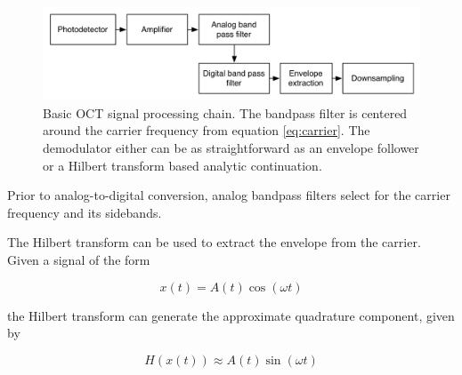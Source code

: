 
\begin{figure}[h!]
  \centering
  \includegraphics[width=1.0\textwidth]{Images/background/basic_dsp.png}
\caption[Basic OCT signal processing chain.]{Basic OCT signal processing chain. The bandpass filter is centered around the carrier frequency from equation \ref{eq:carrier}. The demodulator either can be as straightforward as an envelope follower or a Hilbert transform based analytic continuation.}
\end{figure}

Prior to analog-to-digital conversion, analog bandpass filters select for the carrier frequency and its sidebands.

The Hilbert transform can be used to extract the envelope from the carrier. Given a signal of the form

\begin{equation}
x(t) = A(t)\cos{(\omega t)}
\end{equation}

the Hilbert transform can generate the approximate quadrature component, given by

\begin{equation}
H(x(t)) \approx A(t) \sin{(\omega t)}
\end{equation}


